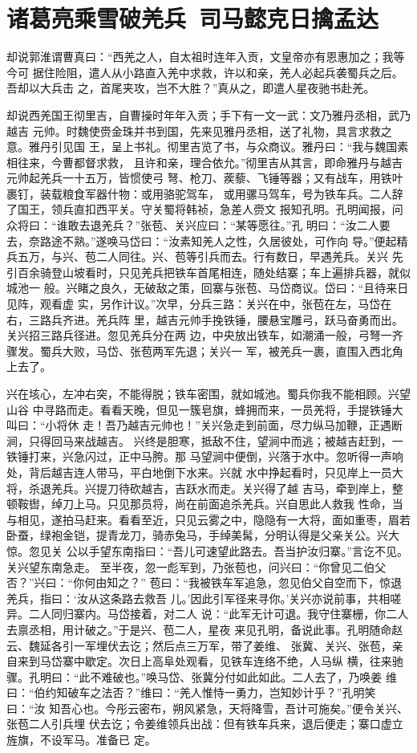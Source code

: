 \chapter{诸葛亮乘雪破羌兵~司马懿克日擒孟达}

却说郭淮谓曹真曰：“西羌之人，自太祖时连年入贡，文皇帝亦有恩惠加之；我等今可
据住险阻，遣人从小路直入羌中求救，许以和亲，羌人必起兵袭蜀兵之后。吾却以大兵击
之，首尾夹攻，岂不大胜？”真从之，即遣人星夜驰书赴羌。

却说西羌国王彻里吉，自曹操时年年入贡；手下有一文一武：文乃雅丹丞相，武乃越吉
元帅。时魏使赍金珠并书到国，先来见雅丹丞相，送了礼物，具言求救之意。雅丹引见国
王，呈上书礼。彻里吉览了书，与众商议。雅丹曰：“我与魏国素相往来，今曹都督求救，
且许和亲，理合依允。”彻里吉从其言，即命雅丹与越吉元帅起羌兵一十五万，皆惯使弓
弩、枪刀、蒺藜、飞锤等器；又有战车，用铁叶裹钉，装载粮食军器什物：或用骆驼驾车，
或用骡马驾车，号为铁车兵。二人辞了国王，领兵直扣西平关。守关蜀将韩祯，急差人赍文
报知孔明。孔明闻报，问众将曰：“谁敢去退羌兵？”张苞、关兴应曰：“某等愿往。”孔
明曰：“汝二人要去，奈路途不熟。”遂唤马岱曰：“汝素知羌人之性，久居彼处，可作向
导。”便起精兵五万，与兴、苞二人同往。兴、苞等引兵而去。行有数日，早遇羌兵。关兴
先引百余骑登山坡看时，只见羌兵把铁车首尾相连，随处结寨；车上遍排兵器，就似城池一
般。兴睹之良久，无破敌之策，回寨与张苞、马岱商议。岱曰：“且待来日见阵，观看虚
实，另作计议。”次早，分兵三路：关兴在中，张苞在左，马岱在右，三路兵齐进。羌兵阵
里，越吉元帅手挽铁锤，腰悬宝雕弓，跃马奋勇而出。关兴招三路兵径进。忽见羌兵分在两
边，中央放出铁车，如潮涌一般，弓弩一齐骤发。蜀兵大败，马岱、张苞两军先退；关兴一
军，被羌兵一裹，直围入西北角上去了。

兴在垓心，左冲右突，不能得脱；铁车密围，就如城池。蜀兵你我不能相顾。兴望山谷
中寻路而走。看看天晚，但见一簇皂旗，蜂拥而来，一员羌将，手提铁锤大叫曰：“小将休
走！吾乃越吉元帅也！”关兴急走到前面，尽力纵马加鞭，正遇断涧，只得回马来战越吉。
兴终是胆寒，抵敌不住，望涧中而逃；被越吉赶到，一铁锤打来，兴急闪过，正中马胯。那
马望涧中便倒，兴落于水中。忽听得一声响处，背后越吉连人带马，平白地倒下水来。兴就
水中挣起看时，只见岸上一员大将，杀退羌兵。兴提刀待砍越吉，吉跃水而走。关兴得了越
吉马，牵到岸上，整顿鞍辔，绰刀上马。只见那员将，尚在前面追杀羌兵。兴自思此人救我
性命，当与相见，遂拍马赶来。看看至近，只见云雾之中，隐隐有一大将，面如重枣，眉若
卧蚕，绿袍金铠，提青龙刀，骑赤兔马，手绰美髯，分明认得是父亲关公。兴大惊。忽见关
公以手望东南指曰：“吾儿可速望此路去。吾当护汝归寨。”言讫不见。关兴望东南急走。
至半夜，忽一彪军到，乃张苞也，问兴曰：“你曾见二伯父否？”兴曰：“你何由知之？”
苞曰：“我被铁车军追急，忽见伯父自空而下，惊退羌兵，指曰：‘汝从这条路去救吾
儿。’因此引军径来寻你。’关兴亦说前事，共相嗟异。二人同归寨内。马岱接着，对二人
说：“此军无计可退。我守住寨栅，你二人去禀丞相，用计破之。”于是兴、苞二人，星夜
来见孔明，备说此事。孔明随命赵云、魏延各引一军埋伏去讫；然后点三万军，带了姜维、
张冀、关兴、张苞，亲自来到马岱寨中歇定。次日上高阜处观看，见铁车连络不绝，人马纵
横，往来驰骤。孔明曰：“此不难破也。”唤马岱、张冀分付如此如此。二人去了，乃唤姜
维曰：“伯约知破车之法否？”维曰：“羌人惟恃一勇力，岂知妙计乎？”孔明笑曰：“汝
知吾心也。今彤云密布，朔风紧急，天将降雪，吾计可施矣。”便令关兴、张苞二人引兵埋
伏去讫；令姜维领兵出战：但有铁车兵来，退后便走；寨口虚立旌旗，不设军马。准备已
定。

